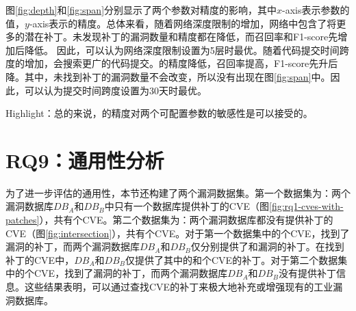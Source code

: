 图\ref{fig:depth}和\ref{fig:span}分别显示了两个参数对\tool 精度的影响，其中$x$-axis表示参数的值，$y$-axis表示\tool 的精度。总体来看，随着网络深度限制的增加，网络中包含了将更多的潜在补丁。\tool 未发现补丁的漏洞数量和精度都在降低，而召回率和F1-score先增加后降低。
因此，可以认为网络深度限制设置为5层时最优。随着代码提交时间跨度的增加，\tool 会搜索更广的代码提交。\tool 的精度降低，召回率提高，F1-score先升后降。其中，\tool 未找到补丁的漏洞数量不会改变，所以没有出现在图\ref{fig:span}中。因此，可以认为提交时间跨度设置为30天时最优。

\begin{tcolorbox}[size=title,opacityfill=0.15]
Highlight：总的来说，\tool 的精度对两个可配置参数的敏感性是可以接受的。
\end{tcolorbox}

\section{RQ9：通用性分析}\label{sec:generality}


为了进一步评估\tool 的通用性，本节还构建了两个漏洞数据集。第一个数据集为：两个漏洞数据库$DB_A$和$DB_B$中只有一个数据库提供补丁的CVE（图\ref{fig:rq1-cves-with-patches}），共有个CVE。第二个数据集为：两个漏洞数据库都没有提供补丁的CVE（图\ref{fig:intersection}），共有个CVE。对于第一个数据集中的个CVE，\tool 找到了漏洞的补丁，而两个漏洞数据库$DB_A$和$DB_B$仅分别提供了和漏洞的补丁。在\tool 找到补丁的CVE中，$DB_A$和$DB_B$仅提供了其中的和个CVE的补丁。对于第二个数据集中的个CVE，\tool 找到了漏洞的补丁，而两个漏洞数据库$DB_A$和$DB_B$没有提供补丁信息。这些结果表明，\tool 可以通过查找CVE的补丁来极大地补充或增强现有的工业漏洞数据库。


